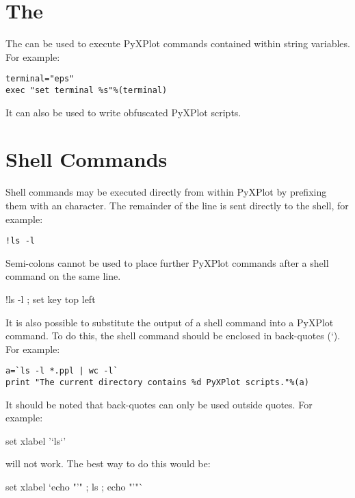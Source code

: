\section{The }

The  can be used to execute PyXPlot commands contained within
string variables. For example:

\begin{verbatim}
terminal="eps"
exec "set terminal %s"%(terminal)
\end{verbatim}

It can also be used to write obfuscated PyXPlot scripts.

\section{Shell Commands}

Shell commands may be executed directly from
within PyXPlot by prefixing them with an \indcmdts{!} character. The
remainder of the line is sent directly to the shell, for example:

\begin{verbatim}
!ls -l
\end{verbatim}

\noindent Semi-colons cannot be used to place further PyXPlot commands after a
shell command on the same line.

\begin{dontdo}
!ls -l ; set key top left
\end{dontdo}

It is also possible to substitute the output of a shell command into a PyXPlot
command. To do this, the shell command should be enclosed in back-quotes (`).
For example:

\begin{verbatim}
a=`ls -l *.ppl | wc -l`
print "The current directory contains %d PyXPlot scripts."%(a)
\end{verbatim}

It should be noted that back-quotes can only be used outside quotes. For
example:

\begin{dontdo}
set xlabel '`ls`'
\end{dontdo}

\noindent will not work. The best way to do this would be:

\begin{dodo}
set xlabel `echo "'" ; ls ; echo "'"`
\end{dodo}

